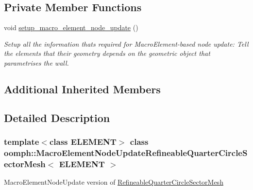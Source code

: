 \subsection*{Private Member Functions}
\begin{DoxyCompactItemize}
\item 
void \hyperlink{classoomph_1_1MacroElementNodeUpdateRefineableQuarterCircleSectorMesh_a94b5efa53ac7689757dad989098df7ed}{setup\+\_\+macro\+\_\+element\+\_\+node\+\_\+update} ()
\begin{DoxyCompactList}\small\item\em Setup all the information that\textquotesingle{}s required for Macro\+Element-\/based node update\+: Tell the elements that their geometry depends on the geometric object that parametrises the wall. \end{DoxyCompactList}\end{DoxyCompactItemize}
\subsection*{Additional Inherited Members}


\subsection{Detailed Description}
\subsubsection*{template$<$class E\+L\+E\+M\+E\+NT$>$\newline
class oomph\+::\+Macro\+Element\+Node\+Update\+Refineable\+Quarter\+Circle\+Sector\+Mesh$<$ E\+L\+E\+M\+E\+N\+T $>$}

Macro\+Element\+Node\+Update version of \hyperlink{classoomph_1_1RefineableQuarterCircleSectorMesh}{Refineable\+Quarter\+Circle\+Sector\+Mesh}


